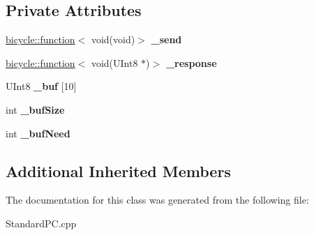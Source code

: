 \subsection*{Private Attributes}
\begin{DoxyCompactItemize}
\item 
\mbox{\label{class_standard_p_c___internal_1_1_p_s2_controller_1_1_command_ae9ea09a4f0b21dd90ce03f5ef31de5dc}} 
\hyperlink{classbicycle_1_1function}{bicycle\+::function}$<$ void(void)$>$ {\bfseries \+\_\+send}
\item 
\mbox{\label{class_standard_p_c___internal_1_1_p_s2_controller_1_1_command_af0191786a5119b3ebc2ae7294d07d285}} 
\hyperlink{classbicycle_1_1function}{bicycle\+::function}$<$ void(U\+Int8 $\ast$)$>$ {\bfseries \+\_\+response}
\item 
\mbox{\label{class_standard_p_c___internal_1_1_p_s2_controller_1_1_command_aae34086a4164bf871a11adb7b992ba5a}} 
U\+Int8 {\bfseries \+\_\+buf} \mbox{[}10\mbox{]}
\item 
\mbox{\label{class_standard_p_c___internal_1_1_p_s2_controller_1_1_command_a7427d625cc5e4dafead570ffc5d50b6a}} 
int {\bfseries \+\_\+buf\+Size}
\item 
\mbox{\label{class_standard_p_c___internal_1_1_p_s2_controller_1_1_command_a878b30ece9502bea3c2e7453dcc54672}} 
int {\bfseries \+\_\+buf\+Need}
\end{DoxyCompactItemize}
\subsection*{Additional Inherited Members}


The documentation for this class was generated from the following file\+:\begin{DoxyCompactItemize}
\item 
Standard\+P\+C.\+cpp\end{DoxyCompactItemize}
